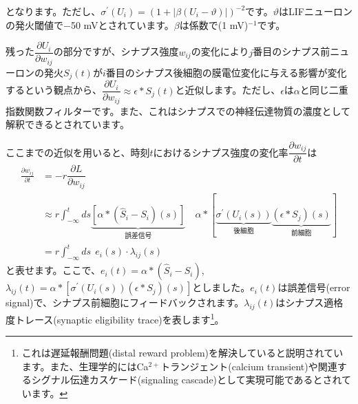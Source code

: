 となります。ただし、$\sigma^{\prime}\left(U_{i}\right)=(1+|\beta(U_i-\vartheta)|)^{-2}$です。$\vartheta$はLIFニューロンの発火閾値で$-$50 mVとされています。$\beta$は係数で(1 mV)$^{-1}$です。\par
残った$\dfrac{\partial U_{i}}{\partial w_{i j}}$の部分ですが、シナプス強度$w_{ij}$の変化により$j$番目のシナプス前ニューロンの発火$S_j(t)$が$i$番目のシナプス後細胞の膜電位変化に与える影響が変化するという観点から、$\dfrac{\partial U_{i}}{\partial w_{i j}}\approx \epsilon* S_j(t)$と近似します。ただし、$\epsilon$は$\alpha$と同じ二重指数関数フィルターです。また、これはシナプスでの神経伝達物質の濃度として解釈できるとされています。\par
ここまでの近似を用いると、時刻$t$におけるシナプス強度の変化率$\dfrac{\partial w_{ij}}{\partial t}$は
\begin{align}
\frac{\partial w_{ij}}{\partial t}&=-r \dfrac{\partial L}{\partial w_{i j}}\\
&\approx r\int_{-\infty}^{t} ds\underbrace{\left[\alpha * \left(\hat{S}_{i}-S_{i}\right)(s)\right]}_{誤差信号}\quad\alpha *\left[ \underbrace{\sigma^{\prime}\left(U_{i}(s)\right)}_{後細胞}\underbrace{\left(\epsilon * S_{j}\right)(s)}_{前細胞}\right]\\
&=r\int_{-\infty}^{t} ds\ \ e_i(s)\cdot \lambda_{ij}(s)
\end{align}
と表せます。ここで、$e_i(t)=\alpha * \left(\hat{S}_{i}-S_{i}\right)$, $\lambda_{ij}(t)=\alpha *\left[\sigma^{\prime}\left(U_{i}(s)\right)\left(\epsilon * S_{j}\right)(s)\right]$としました。$e_i(t)$は誤差信号(error signal)で、シナプス前細胞にフィードバックされます。$\lambda_{ij}(t)$はシナプス適格度トレース(synaptic eligibility trace)を表します\footnote{これは遅延報酬問題(distal reward problem)を解決していると説明されています。また、生理学的にはCa$^{2+}$トランジェント(calcium transient)や関連するシグナル伝達カスケード(signaling cascade)として実現可能であるとされています。}。\par
